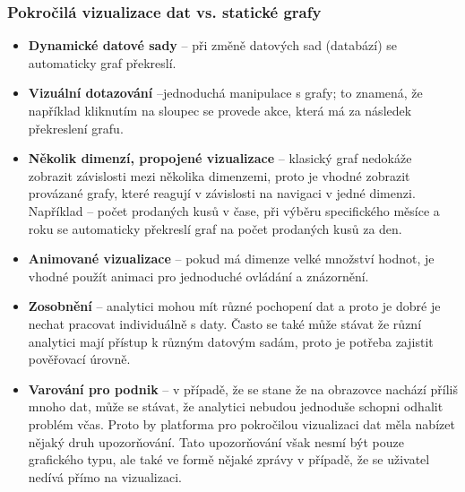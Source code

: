 \subsubsection{Pokročilá vizualizace dat vs. statické grafy}
\begin{itemize}
\item \textbf{Dynamické datové sady} -- při změně datových sad (databází) se automaticky graf překreslí.
\item \textbf{Vizuální dotazování} --jednoduchá manipulace s grafy; to znamená, že například kliknutím na sloupec se provede akce, která má za následek překreslení grafu.
\item \textbf{Několik dimenzí, propojené vizualizace} -- klasický graf nedokáže zobrazit závislosti mezi několika dimenzemi, proto je vhodné zobrazit provázané grafy, které reagují v závislosti na navigaci v jedné dimenzi. Například -- počet prodaných kusů v čase, při výběru specifického měsíce a roku se automaticky překreslí graf na počet prodaných kusů za den.
\item \textbf{Animované vizualizace} -- pokud má dimenze velké množství hodnot, je vhodné použít animaci pro jednoduché ovládání a znázornění.
\item \textbf{Zosobnění} -- analytici mohou mít různé pochopení dat a proto je dobré je nechat pracovat individuálně s daty. Často se také může stávat že různí analytici mají přístup k různým datovým sadám, proto je potřeba zajistit pověřovací úrovně.
\item \textbf{Varování pro podnik} -- v případě, že se stane že na obrazovce nachází příliš mnoho dat, může se stávat, že analytici nebudou jednoduše schopni odhalit problém včas. Proto by platforma pro pokročilou vizualizaci dat měla nabízet nějaký druh upozorňování. Tato upozorňování však nesmí být pouze grafického typu, ale také ve formě nějaké zprávy v případě, že se uživatel nedívá přímo na vizualizaci. \cite{advanced-data-vizualization-platforms}
\end{itemize}

